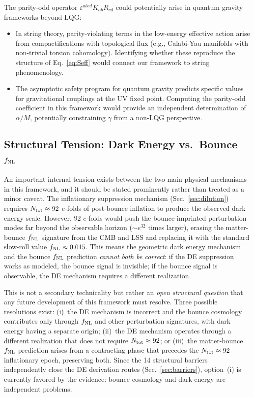 \documentclass[aps,prd,twocolumn,superscriptaddress,showpacs,preprintnumbers,nofootinbib,longbibliography,floatfix]{revtex4-2}
\newcommand{\fnl}{f_{\rm NL}}
\begin{document}
The parity-odd operator $\varepsilon^{abcd}K_{ab}R_{cd}$ could potentially arise in quantum gravity frameworks beyond LQG:

\begin{itemize}[leftmargin=*]
\item In string theory, parity-violating terms in the low-energy effective action arise from compactifications with topological flux (e.g., Calabi-Yau manifolds with non-trivial torsion cohomology). Identifying whether these reproduce the structure of Eq.~\eqref{eq:Seff} would connect our framework to string phenomenology.
\item The asymptotic safety program for quantum gravity predicts specific values for gravitational couplings at the UV fixed point. Computing the parity-odd coefficient in this framework would provide an independent determination of $\alpha/M$, potentially constraining $\gamma$ from a non-LQG perspective.
\end{itemize}

\subsection{Structural Tension: Dark Energy vs.\ Bounce $\fnl$}\label{sec:structural_tension}

An important internal tension exists between the two main physical mechanisms in this framework, and it should be stated prominently rather than treated as a minor caveat. The inflationary suppression mechanism (Sec.~\ref{sec:dilution}) requires $N_{\rm tot} \approx 92$ $e$-folds of post-bounce inflation to produce the observed dark energy scale. However, $92$ $e$-folds would push the bounce-imprinted perturbation modes far beyond the observable horizon (${\sim}e^{32}$ times larger), erasing the matter-bounce $\fnl$ signature from the CMB and LSS and replacing it with the standard slow-roll value $\fnl \approx 0.015$. This means the geometric dark energy mechanism and the bounce $\fnl$ prediction \emph{cannot both be correct}: if the DE suppression works as modeled, the bounce signal is invisible; if the bounce signal is observable, the DE mechanism requires a different realization.

This is not a secondary technicality but rather an \emph{open structural question} that any future development of this framework must resolve. Three possible resolutions exist: (i)~the DE mechanism is incorrect and the bounce cosmology contributes only through $\fnl$ and other perturbation signatures, with dark energy having a separate origin; (ii)~the DE mechanism operates through a different realization that does not require $N_{\rm tot} \approx 92$; or (iii)~the matter-bounce $\fnl$ prediction arises from a contracting phase that precedes the $N_{\rm tot} \approx 92$ inflationary epoch, preserving both. Since the 14 structural barriers independently close the DE derivation routes (Sec.~\ref{sec:barriers}), option~(i) is currently favored by the evidence: bounce cosmology and dark energy are independent problems.
\end{document}
